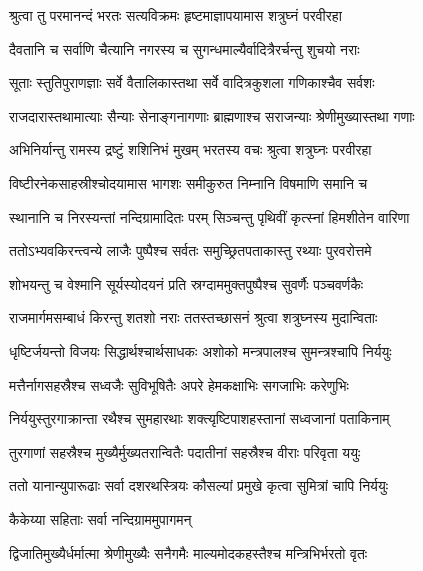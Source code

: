 
\twolineshloka
{श्रुत्वा तु परमानन्दं भरतः सत्यविक्रमः}
{हृष्टमाज्ञापयामास शत्रुघ्नं परवीरहा} %

\twolineshloka
{दैवतानि च सर्वाणि चैत्यानि नगरस्य च}
{सुगन्धमाल्यैर्वादित्रैरर्चन्तु शुचयो नराः} %

\twolineshloka
{सूताः स्तुतिपुराणज्ञाः सर्वे वैतालिकास्तथा}
{सर्वे वादित्रकुशला गणिकाश्चैव सर्वशः} %

\twolineshloka
{राजदारास्तथामात्याः सैन्याः सेनाङ्गनागणाः}
{ब्राह्मणाश्च सराजन्याः श्रेणीमुख्यास्तथा गणाः} %

\twolineshloka
{अभिनिर्यान्तु रामस्य द्रष्टुं शशिनिभं मुखम्}
{भरतस्य वचः श्रुत्वा शत्रुघ्नः परवीरहा} %

\twolineshloka
{विष्टीरनेकसाहस्रीश्चोदयामास भागशः}
{समीकुरुत निम्नानि विषमाणि समानि च} %

\twolineshloka
{स्थानानि च निरस्यन्तां नन्दिग्रामादितः परम्}
{सिञ्चन्तु पृथिवीं कृत्स्नां हिमशीतेन वारिणा} %

\twolineshloka
{ततोऽभ्यवकिरन्त्वन्ये लाजैः पुष्पैश्च सर्वतः}
{समुच्छ्रितपताकास्तु रथ्याः पुरवरोत्तमे} %

\twolineshloka
{शोभयन्तु च वेश्मानि सूर्यस्योदयनं प्रति}
{स्रग्दाममुक्तपुष्पैश्च सुवर्णैः पञ्चवर्णकैः} %

\twolineshloka
{राजमार्गमसम्बाधं किरन्तु शतशो नराः}
{ततस्तच्छासनं श्रुत्वा शत्रुघ्नस्य मुदान्विताः} %

\twolineshloka
{धृष्टिर्जयन्तो विजयः सिद्धार्थश्चार्थसाधकः}
{अशोको मन्त्रपालश्च सुमन्त्रश्चापि निर्ययुः} %

\twolineshloka
{मत्तैर्नागसहस्रैश्च सध्वजैः सुविभूषितैः}
{अपरे हेमकक्षाभिः सगजाभिः करेणुभिः} %

\twolineshloka
{निर्ययुस्तुरगाक्रान्ता रथैश्च सुमहारथाः}
{शक्त्यृष्टिपाशहस्तानां सध्वजानां पताकिनाम्} %

\twolineshloka
{तुरगाणां सहस्रैश्च मुख्यैर्मुख्यतरान्वितैः}
{पदातीनां सहस्रैश्च वीराः परिवृता ययुः} %

\twolineshloka
{ततो यानान्युपारूढाः सर्वा दशरथस्त्रियः}
{कौसल्यां प्रमुखे कृत्वा सुमित्रां चापि निर्ययुः} %

\onelineshloka
{कैकेय्या सहिताः सर्वा नन्दिग्राममुपागमन्} %

\twolineshloka
{द्विजातिमुख्यैर्धर्मात्मा श्रेणीमुख्यैः सनैगमैः}
{माल्यमोदकहस्तैश्च मन्त्रिभिर्भरतो वृतः} %

